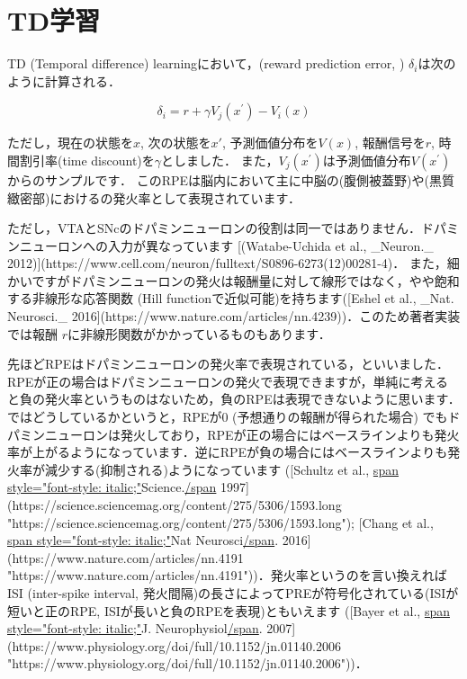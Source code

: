\section{TD学習}

TD (Temporal difference) learningにおいて，\textbf{}(reward prediction error, \textbf{}) $\delta_{i}$は次のように計算される． 

 
\begin{equation}
\delta_{i}=r+\gamma V_{j}\left(x^{\prime}\right)-V_{i}(x) 
\end{equation}
 

ただし，現在の状態を$x$, 次の状態を$x'$, 予測価値分布を$V(x)$, 報酬信号を$r$, 時間割引率(time discount)を$\gamma$としました．
また，$V_{j}\left(x^{\prime}\right)$は予測価値分布$V\left(x^{\prime}\right)$からのサンプルです． このRPEは脳内において主に中脳の\textbf{}(腹側被蓋野)や\textbf{}(黒質緻密部)における\textbf{}の発火率として表現されています．

ただし，VTAとSNcのドパミンニューロンの役割は同一ではありません．ドパミンニューロンへの入力が異なっています [(Watabe-Uchida et al., _Neuron._ 2012)](https://www.cell.com/neuron/fulltext/S0896-6273(12)00281-4)． また，細かいですがドパミンニューロンの発火は報酬量に対して線形ではなく，やや飽和する非線形な応答関数 (Hill functionで近似可能)を持ちます([Eshel et al., _Nat. Neurosci._ 2016](https://www.nature.com/articles/nn.4239))．このため著者実装では報酬 $r$に非線形関数がかかっているものもあります．

先ほどRPEはドパミンニューロンの発火率で表現されている，といいました．RPEが正の場合はドパミンニューロンの発火で表現できますが，単純に考えると負の発火率というものはないため，負のRPEは表現できないように思います．ではどうしているかというと，RPEが0 (予想通りの報酬が得られた場合) でもドパミンニューロンは発火しており，RPEが正の場合にはベースラインよりも発火率が上がるようになっています．逆にRPEが負の場合にはベースラインよりも発火率が減少する(抑制される)ようになっています
    ([Schultz et al., \url{span style="font-style: italic;"}Science.\url{/span} 1997](https://science.sciencemag.org/content/275/5306/1593.long "https://science.sciencemag.org/content/275/5306/1593.long"); [Chang et al., \url{span style="font-style: italic;"}Nat Neurosci\url{/span}. 2016](https://www.nature.com/articles/nn.4191 "https://www.nature.com/articles/nn.4191"))．発火率というのを言い換えればISI (inter-spike interval, 発火間隔)の長さによってPREが符号化されている(ISIが短いと正のRPE, ISIが長いと負のRPEを表現)ともいえます ([Bayer et al., \url{span style="font-style: italic;"}J.
    Neurophysiol\url{/span}. 2007](https://www.physiology.org/doi/full/10.1152/jn.01140.2006 "https://www.physiology.org/doi/full/10.1152/jn.01140.2006"))．

